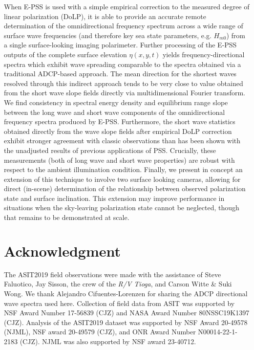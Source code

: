 \documentclass[letterpaper,draftcls,onecolumn]{IEEEtran}
\begin{document}
\noindent When E-PSS is used with a simple empirical correction to the measured degree of linear polarization (DoLP), it is able to provide an accurate remote determination of the omnidirectional frequency spectrum across a wide range of surface wave frequencies (and therefore key sea state parameters, e.g. $H_{m0}$) from a single surface-looking imaging polarimeter. Further processing of the E-PSS outputs of the complete surface elevation $\eta(x,y,t)$ yields frequency-directional spectra which exhibit wave spreading comparable to the spectra obtained via a traditional ADCP-based approach. The mean direction for the shortest waves resolved through this indirect approach tends to be very close to value obtained from the short wave slope fields directly via multidimensional Fourier transform. We find consistency in spectral energy density and equilibrium range slope between the long wave and short wave components of the omnidirectional frequency spectra produced by E-PSS. Furthermore, the short wave statistics obtained directly from the wave slope fields after empirical DoLP correction exhibit stronger agreement with classic observations than has been shown with the unadjusted results of previous applications of PSS. Crucially, these measurements (both of long wave and short wave properties) are robust with respect to the ambient illumination condition. Finally, we present in concept an extension of this technique to involve two surface looking cameras, allowing for direct (in-scene) determination of the relationship between observed polarization state and surface inclination. This extension may improve performance in situations when the sky-leaving polarization state cannot be neglected, though that remains to be demonstrated at scale.

\section*{Acknowledgment}

The ASIT2019 field observations were made with the assistance of Steve Faluotico, Jay Sisson, the crew of the \textit{R/V Tioga}, and Carson Witte \& Suki Wong. We thank Alejandro Cifuentes-Lorenzen for sharing the ADCP directional wave spectra used here. Collection of field data from ASIT was supported by NSF Award Number 17-56839 (CJZ) and NASA Award Number 80NSSC19K1397 (CJZ). Analysis of the ASIT2019 dataset was supported by NSF Award 20-49578 (NJML), NSF award 20-49579 (CJZ), and ONR Award Number N00014-22-1-2183 (CJZ). NJML was also supported by NSF award 23-40712.
\end{document}
